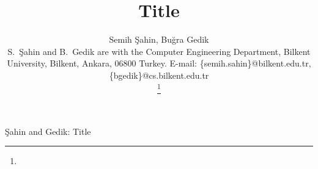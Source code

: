 



  \title{Title}

  \author
  {
    Semih \c{S}ahin,
    Bu\u{g}ra Gedik
    \IEEEcompsocitemizethanks
    {

      \IEEEcompsocthanksitem S.\ \c{S}ahin and B.\ Gedik
             are with the
             Computer Engineering Department, Bilkent
             University, Bilkent, Ankara, 06800 Turkey. E-mail:
             \{semih.sahin\}@bilkent.edu.tr, \{bgedik\}@cs.bilkent.edu.tr
    }%
    \thanks{}
  }

           {\c{Sahin} and Gedik: Title}
  \IEEEcompsoctitleabstractindextext{}
  \maketitle

  \IEEEpeerreviewmaketitle

  
  
  

  
  


